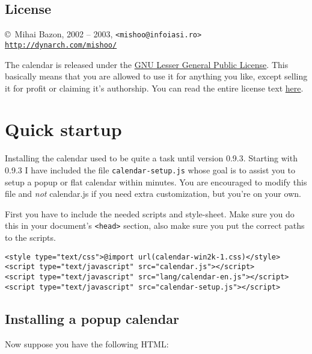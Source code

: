 \documentclass[a4paper,10pt]{article}
\begin{document}
\subsection{License}

\begin{center}
\noindent \copyright\ Mihai Bazon, 2002 -- 2003, \texttt{<mishoo@infoiasi.ro>}\\
\href{http://dynarch.com/mishoo/}{\texttt{http://dynarch.com/mishoo/}}\\
\end{center}

The calendar is released under the
{\href{http://www.gnu.org/licenses/gpl.html}{GNU Lesser General Public
License}}.  This basically means that you are allowed to use it for anything you
like, except selling it for profit or claiming it's authorship.  You can read
the entire license text {\href{http://www.gnu.org/licenses/gpl.html}{here}}.




\section{Quick startup}\label{sec:quick-start}

Installing the calendar used to be quite a task until version 0.9.3.  Starting
with 0.9.3 I have included the file \texttt{calendar-setup.js} whose goal is to
assist you to setup a popup or flat calendar within minutes.  You are
encouraged to modify this file and \emph{not} calendar.js if you need
extra customization, but you're on your own.

First you have to include the needed scripts and style-sheet.  Make sure you do
this in your document's \texttt{<head>} section, also make sure you put the
correct paths to the scripts.

\begin{verbatim}
<style type="text/css">@import url(calendar-win2k-1.css)</style>
<script type="text/javascript" src="calendar.js"></script>
<script type="text/javascript" src="lang/calendar-en.js"></script>
<script type="text/javascript" src="calendar-setup.js"></script>
\end{verbatim}

\subsection{Installing a popup calendar}\label{sec:quick-start-popup}

\noindent Now suppose you have the following HTML:
\end{document}
